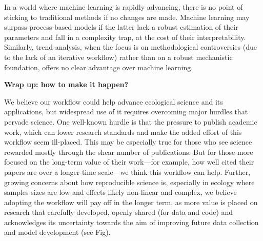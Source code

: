 \documentclass[11pt]{article}
\begin{document}
In a world where machine learning is rapidly advancing, there is no point of sticking to traditional methods if no changes are made. Machine learning may surpass process-based models if the latter lack a robust estimation of their parameters and fall in a complexity trap, at the cost of their interpretability. Similarly, trend analysis, when the focus is on methodological controversies (due to the lack of an iterative workflow) rather than on a robust mechanistic foundation, offers no clear advantage over machine learning.


\vspace{0.5cm}
\noindent \textbf{Wrap up: how to make it happen?}

We believe our workflow could help advance ecological science and its applications, but widespread use of it requires overcoming major hurdles that pervade science. 
One well-known hurdle is that the pressure to publish academic work, which can lower research standards and make the added effort of this workflow seem ill-placed. This may be especially true for those who see science rewarded mostly through the shear number of publications. But for those more focused on the long-term value of their work---for example, how well cited their papers are over a longer-time scale---we think this workflow can help. Further, growing concerns about how reproducible science is, especially in ecology where samples sizes are low and effects likely non-linear and complex, we believe adopting the workflow will pay off in the longer term, as more value is placed on research that carefully developed, openly shared (for data and code) and acknowledges its uncertainty towards the aim of improving future data collection and model development (see Fig). 
\end{document}
